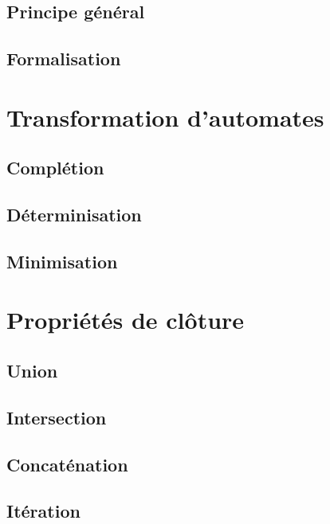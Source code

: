 \subsection{Principe général}

\subsection{Formalisation}

\section{Transformation d'automates}
\label{transauto}

\subsection{Complétion}

\subsection{Déterminisation}

\subsection{Minimisation}

\section{Propriétés de clôture}
\label{cloture}
\subsection{Union}

\subsection{Intersection}

\subsection{Concaténation}

\subsection{Itération}


